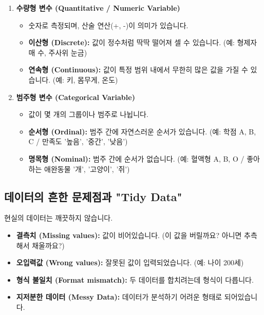 \documentclass[11pt,a4paper]{book}
\theoremstyle{definition}
\begin{document}
\begin{enumerate}
    \item \textbf{수량형 변수 (Quantitative / Numeric Variable)}
    \begin{itemize}
        \item 숫자로 측정되며, 산술 연산(+, -)이 의미가 있습니다.
        \item \textbf{이산형 (Discrete):} 값이 정수처럼 딱딱 떨어져 셀 수 있습니다. (예: 형제자매 수, 주사위 눈금)
        \item \textbf{연속형 (Continuous):} 값이 특정 범위 내에서 무한히 많은 값을 가질 수 있습니다. (예: 키, 몸무게, 온도)
    \end{itemize}

    \item \textbf{범주형 변수 (Categorical Variable)}
    \begin{itemize}
        \item 값이 몇 개의 그룹이나 범주로 나뉩니다.
        \item \textbf{순서형 (Ordinal):} 범주 간에 자연스러운 순서가 있습니다. (예: 학점 A, B, C / 만족도 '높음', '중간', '낮음')
        \item \textbf{명목형 (Nominal):} 범주 간에 순서가 없습니다. (예: 혈액형 A, B, O / 좋아하는 애완동물 '개', '고양이', '쥐')
    \end{itemize}
\end{enumerate}

\subsection{데이터의 흔한 문제점과 "Tidy Data"}

현실의 데이터는 깨끗하지 않습니다.
\begin{itemize}
    \item \textbf{결측치 (Missing values):} 값이 비어있습니다. (이 값을 버릴까요? 아니면 추측해서 채울까요?)
    \item \textbf{오입력값 (Wrong values):} 잘못된 값이 입력되었습니다. (예: 나이 200세)
    \item \textbf{형식 불일치 (Format mismatch):} 두 데이터를 합치려는데 형식이 다릅니다.
    \item \textbf{지저분한 데이터 (Messy Data):} 데이터가 분석하기 어려운 형태로 되어있습니다.
\end{itemize}
\end{document}
